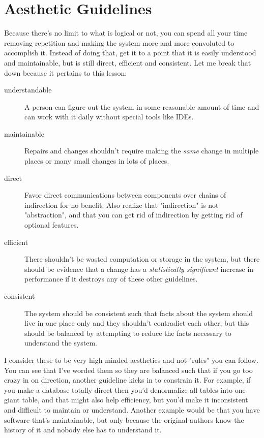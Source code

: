 \section{Aesthetic Guidelines}

Because there's no limit to what is logical or not, you can spend all your time
removing repetition and making the system more and more convoluted to
accomplish it.  Instead of doing that, get it to a point that it is easily
understood and maintainable, but is still direct, efficient and consistent.  Let me break
that down because it pertains to this lesson:

\begin{description}
\item [understandable] A person can figure out the system in some reasonable amount of time and
    can work with it daily without special tools like IDEs.
\item [maintainable] Repairs and changes shouldn't require making the \emph{same} change in multiple
    places or many small changes in lots of places.
\item [direct] Favor direct communications between components over chains of indirection
    for no benefit.  Also realize that "indirection" is not "abstraction", and that you
    can get rid of indirection by getting rid of optional features.
\item [efficient] There shouldn't be wasted computation or storage in the system, but there
    should be evidence that a change has a \emph{statistically significant} increase in
    performance if it destroys any of these other guidelines.
\item [consistent] The system should be consistent such that facts about the system should
    live in one place only and they shouldn't contradict each other, but this should be
    balanced by attempting to reduce the facts necessary to understand the system.
\end{description}

I consider these to be very high minded aesthetics and not "rules" you can follow.  You can
see that I've worded them so they are balanced such that if you go too crazy in on direction,
another guideline kicks in to constrain it.  For example, if you make a database totally
direct then you'd denormalize all tables into one giant table, and that might also help
efficiency, but you'd make it inconsistent and difficult to maintain or understand.  Another
example would be that you have software that's maintainable, but only because the original
authors know the history of it and nobody else has to understand it.

